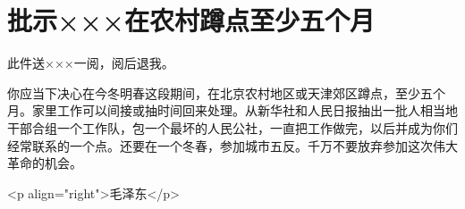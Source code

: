\section[批示×××在农村蹲点至少五个月（一九六三年六月三日）]{批示×××在农村蹲点至少五个月}


此件送×××一阅，阅后退我。

你应当下决心在今冬明春这段期间，在北京农村地区或天津郊区蹲点，至少五个月。家里工作可以间接或抽时间回来处理。从新华社和人民日报抽出一批人相当地干部合组一个工作队，包一个最坏的人民公社，一直把工作做完，以后并成为你们经常联系的一个点。还要在一个冬春，参加城市五反。千万不要放弃参加这次伟大革命的机会。

<p align="right">毛泽东</p>


